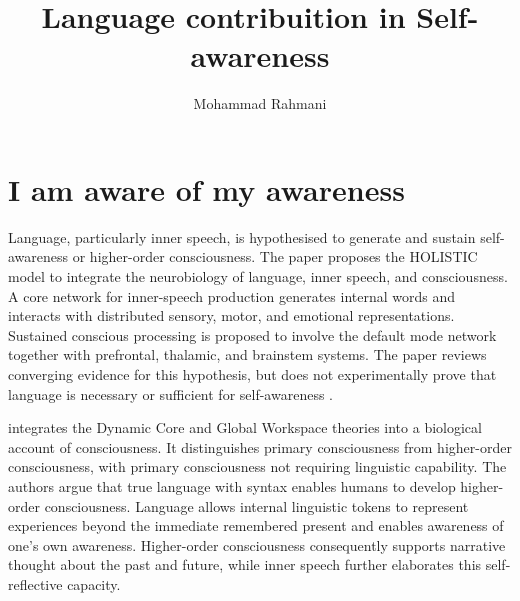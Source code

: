 \documentclass[a4paper]{article}
\title{Language contribuition in Self-awareness}
\date{}
\author{Mohammad Rahmani}
\begin{document}
    \maketitle
    
    
    \section{I am aware of my awareness}
        Language, particularly inner speech, is hypothesised to generate and sustain self-awareness or higher-order consciousness. The paper proposes the HOLISTIC model to integrate the neurobiology of language, inner speech, and consciousness. A core network for inner-speech production generates internal words and interacts with distributed sensory, motor, and emotional representations. Sustained conscious processing is proposed to involve the default mode network together with prefrontal, thalamic, and brainstem systems. The paper reviews converging evidence for this hypothesis, but does not experimentally prove that language is necessary or sufficient for self-awareness \cite{skipper-2022-a-voice-without-a-mouth-no-more-the-neurobiology-of-language-and-consciousness}.
        
        \cite{edelman-2011-biology-of-consciousness} integrates the Dynamic Core and Global Workspace theories into a biological account of consciousness. It distinguishes primary consciousness from higher-order consciousness, with primary consciousness not requiring linguistic capability. The authors argue that true language with syntax enables humans to develop higher-order consciousness. Language allows internal linguistic tokens to represent experiences beyond the immediate remembered present and enables awareness of one's own awareness. Higher-order consciousness consequently supports narrative thought about the past and future, while inner speech further elaborates this self-reflective capacity.
        
        
        
        
        
\end{document}
